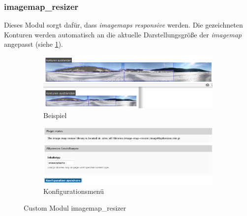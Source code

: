 \newpage
\subsubsection{imagemap\_resizer}\label{subsub:imagemapresizer}
Dieses Modul sorgt dafür, dass \textit{\glspl{imagemap}} \textit{responsive} werden. Die gezeichneten Konturen werden automatisch an die aktuelle Darstellungsgröße der \textit{\gls{imagemap}} angepasst (siehe \cref{fig:example_imagemapresizer}).

\begin{figure}[H]
	\centering
	\begin{subfigure}{0.45\textwidth}
		\centering
		\includegraphics[width=0.95\linewidth]{images/example_imagemapresizer}
		\caption[]{Beispiel}
		\label{fig:example_imagemapresizer}
	\end{subfigure}
	\begin{subfigure}{0.45\textwidth}
		\centering
		\includegraphics[width=0.95\linewidth]{images/config_imagemapresizer}
		\caption[]{Konfigurationsmenü}
		\label{fig:config_imagemapresizer}
	\end{subfigure}
	\caption{Custom Modul imagemap\_resizer}
	\label{fig:imagemap_resizer}
\end{figure}

